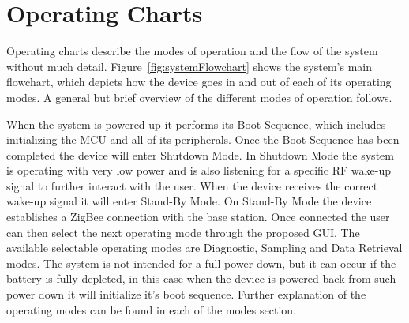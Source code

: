 \section{Operating Charts}
Operating charts describe the modes of operation and the flow of the system without much detail. Figure~\ref{fig:systemFlowchart} shows the system's main flowchart, which depicts how the device goes in and out of each of its operating modes.  A general but brief overview of the different modes of operation follows.  

When the system is powered up it performs its Boot Sequence, which includes initializing the MCU and all of its peripherals. Once the Boot Sequence has been completed the device will enter Shutdown Mode. In Shutdown Mode the system is operating with very low power and is also listening for a specific RF wake-up signal to further interact with the user. When the device receives the correct wake-up signal it will enter Stand-By Mode. On Stand-By Mode the device establishes a ZigBee connection with the base station. Once connected the user can then select the next operating mode through the proposed GUI. The available selectable operating modes are Diagnostic, Sampling and Data Retrieval modes. The system is not intended for a full power down, but it can occur if the battery is fully depleted, in this case when the device is powered back from such power down it will initialize it's boot sequence. Further explanation of the operating modes can be found in each of the modes section. 

